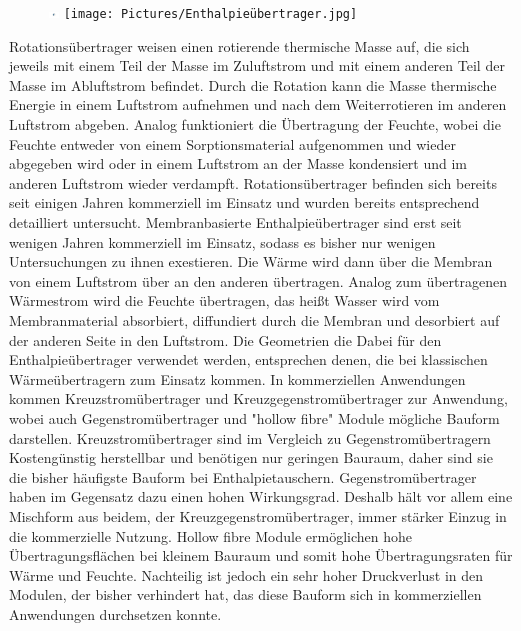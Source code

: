\documentclass[ 11pt
				,ngerman
				,headsepline
				,headings=small
				,numbers=noenddot %
				,draft=false
				,BCOR=0mm %
				,DIV=12
				,captions=tableheading
				,paper=a4
				,abstracton
                ]{scrreprt}
\begin{document}
\begin{normalsize}
\begin{LARGE}
\begin{figure}
	\centering
	\includegraphics[width=10]{Pictures/Rotationswärmeübertrager.jpg}
	\texttt{[image: Pictures/Enthalpieübertrager.jpg]}
\end{figure}

Rotationsübertrager weisen einen rotierende thermische Masse auf, die sich jeweils mit einem Teil der Masse im Zuluftstrom und mit einem anderen Teil der Masse im Abluftstrom befindet. Durch die Rotation kann die Masse thermische Energie in einem Luftstrom aufnehmen und nach dem Weiterrotieren im anderen Luftstrom abgeben. Analog funktioniert die Übertragung der Feuchte, wobei die Feuchte entweder von einem Sorptionsmaterial aufgenommen und wieder abgegeben wird oder in einem Luftstrom an der Masse kondensiert und im anderen Luftstrom wieder verdampft. Rotationsübertrager befinden sich bereits seit einigen Jahren kommerziell im Einsatz und wurden bereits entsprechend detailliert untersucht. %
Membranbasierte Enthalpieübertrager sind erst seit wenigen Jahren kommerziell im Einsatz, sodass es bisher nur wenigen Untersuchungen zu ihnen exestieren. Die Wärme wird dann über die Membran von einem Luftstrom über an den anderen übertragen. Analog zum übertragenen Wärmestrom wird die Feuchte übertragen, das heißt Wasser wird vom Membranmaterial absorbiert, diffundiert durch die Membran und desorbiert auf der anderen Seite in den Luftstrom. Die Geometrien die Dabei für den Enthalpieübertrager verwendet werden, entsprechen denen, die bei klassischen Wärmeübertragern zum Einsatz kommen. In kommerziellen Anwendungen kommen Kreuzstromübertrager und Kreuzgegenstromübertrager zur Anwendung, wobei auch Gegenstromübertrager und "hollow fibre" Module mögliche Bauform darstellen. Kreuzstromübertrager sind im Vergleich zu Gegenstromübertragern Kostengünstig herstellbar und benötigen nur geringen Bauraum, daher sind sie die bisher häufigste Bauform bei Enthalpietauschern. Gegenstromübertrager haben im Gegensatz dazu einen hohen Wirkungsgrad. Deshalb hält vor allem eine Mischform aus beidem, der Kreuzgegenstromübertrager, immer stärker Einzug in die kommerzielle Nutzung. Hollow fibre Module ermöglichen hohe Übertragungsflächen bei kleinem Bauraum und somit hohe Übertragungsraten für Wärme und Feuchte. Nachteilig ist jedoch ein sehr hoher Druckverlust in den Modulen, der bisher verhindert hat, das diese Bauform sich in kommerziellen Anwendungen durchsetzen konnte. 


\end{LARGE}
\end{normalsize}
\end{document}
